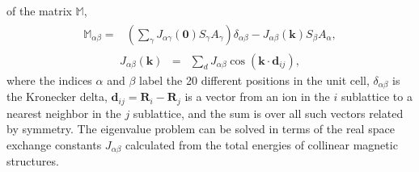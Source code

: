 \documentclass[aps,pre,reprint,superscriptaddress,longbibliography]{revtex4-1}
\newcommand{\mat}[1]{{\ensuremath{\mathds{#1}}}}
\begin{document}
of the matrix $\mat{M}$,
%
\begin{eqnarray}
\begin{aligned}
\mat{M}_{\alpha\beta}=&\left(\sum_{\gamma}J_{\alpha\gamma}(\mathbf{0})S_{\gamma}A_{\gamma}\right)\delta_{\alpha\beta}-J_{\alpha\beta}(\mathbf{k})S_{\beta}A_{\alpha},
\end{aligned}
\label{rmat}
\end{eqnarray}
%
\begin{eqnarray}
J_{\alpha\beta}(\mathbf{k})&=&\sum_{d}J_{\alpha\beta} \cos(\mathbf{k}\cdot\mathbf{d}_{ij}) ,
\label{rmat1}
\end{eqnarray}
%
where the indices $\alpha$ and $\beta$ label the 20 different positions in the unit cell, $\delta_{\alpha\beta}$ is the Kronecker delta, $\mathbf{d}_{ij}=\mathbf{R}_{i}-\mathbf{R}_{j}$ is a vector from an ion in the $i$ sublattice to a nearest neighbor in the $j$ sublattice, and the sum is over all such vectors related by symmetry. The eigenvalue problem can be solved in terms of the real space exchange constants $J_{\alpha\beta}$ calculated from the total energies of collinear magnetic structures. 

 
 

\end{document}
